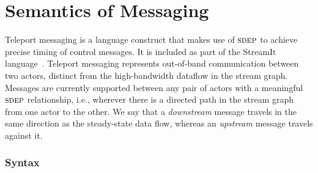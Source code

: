 



\section{Semantics of Messaging}
\label{sec:teleport}


Teleport messaging is a language construct that makes use of $\textsc{sdep}$
to achieve precise timing of control messages.  It is included as part
of the StreamIt language~\cite{thies-cc02}.  Teleport messaging
represents out-of-band communication between two actors, distinct from
the high-bandwidth dataflow in the stream graph.  Messages are
currently supported between any pair of actors with a meaningful
$\textsc{sdep}$ relationship, i.e., wherever there is a directed path in the
stream graph from one actor to the other.  We say that a {\it
downstream} message travels in the same direction as the steady-state
data flow, whereas an {\it upstream} message travels against it.

\subsubsection*{Syntax}

